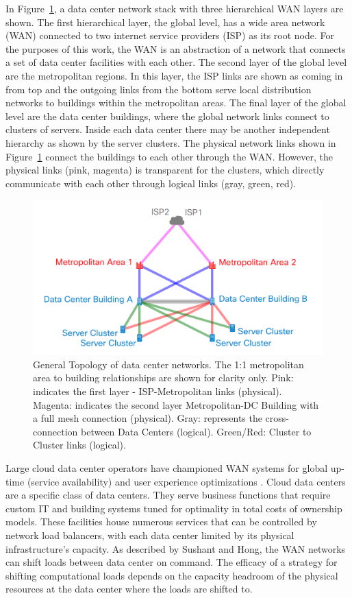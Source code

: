 In Figure~\ref{fig:net_diag}, a data center network stack with three hierarchical WAN layers are shown. The first hierarchical layer, the global level, has a wide area network (WAN) connected to two internet service providers (ISP) as its root node. For the purposes of this work, the WAN is an abstraction of a network that connects a set of data center facilities with each other. The second layer of the global level are the metropolitan regions. In this layer, the ISP links are shown as coming in from top and the outgoing links from the bottom serve local distribution networks to buildings within the metropolitan areas. The final layer of the global level are the data center buildings, where the global network links connect to clusters of servers. Inside each data center there may be another independent hierarchy as shown by the server clusters. The physical network links shown in Figure~\ref{fig:net_diag} connect the buildings to each other through the WAN. However, the physical links (pink, magenta) is transparent for the clusters, which directly communicate with each other through logical links (gray, green, red).

\begin{figure}
  \centering
  \includegraphics[scale=.2]{marginal_energy_cost/img/net_diag.png}
  \caption[Generic Network Topology]{General Topology of data center networks. The 1:1 metropolitan area to building relationships are shown for clarity only. Pink: indicates the first layer - ISP-Metropolitan links (physical). Magenta: indicates the second layer Metropolitan-DC Building with a full mesh connection (physical). Gray: represents the cross-connection between Data Centers (logical). Green/Red: Cluster to Cluster links (logical).}
  \label{fig:net_diag}
  \end{figure}


Large cloud data center operators have championed WAN systems for global up-time (service availability) and user experience optimizations \citep{sushant13} \citep{hong13}. Cloud data centers are a specific class of data centers. They serve business functions that require custom IT and building systems tuned for optimality in total costs of ownership models. These facilities house numerous services that can be controlled by network load balancers, with each data center limited by its physical infrastructure's capacity. As described by Sushant and Hong, the WAN networks can shift loads between data center on command.  The efficacy of a strategy for shifting computational loads depends on the capacity headroom of the physical resources at the data center where the loads are shifted to. 

